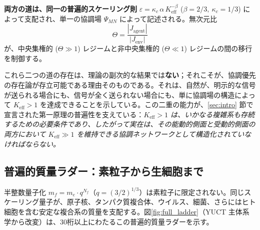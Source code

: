 \documentclass[12pt,a4paper]{article}
\begin{document}
	\medskip
	\noindent
	\textbf{両方の道は、同一の普遍的スケーリング則} \(\varepsilon = \kappa_c\,\alpha\,K_{\mathrm{eff}}^{-\beta}\) (\(\beta = 2/3,\ \kappa_c = 1/3\)) によって支配され、単一の協調場 \(\Psi_{MN}\) によって記述される。無次元比
	\[
	\Theta = \frac{|J_{\mathrm{agent}}|}{|J_{\mathrm{env}}|}
	\]
	が、中央集権的 (\(\Theta \gg 1\)) レジームと非中央集権的 (\(\Theta \ll 1\)) レジームの間の移行を制御する。
	
	これら二つの道の存在は、理論の副次的な結果では\textbf{ない}；それこそが、協調優先の存在論が存立可能である理由そのものである。それは、自然が、明示的な信号が送られる場合にも、信号が全く送られない場合にも、単に協調場の構造によって \(K_{\mathrm{eff}} > 1\) を達成できることを示している。この二重の能力が、\ref{sec:intro} 節で宣言された第一原理の普遍性を支えている：\emph{\(K_{\mathrm{eff}} > 1\) は、いかなる複雑系も存続するための必要条件であり、したがって実在は、その能動的側面と受動的側面の両方において \(K_{\mathrm{eff}} \gg 1\) を維持できる協調ネットワークとして構造化されていなければならない。}
	
	\subsection{普遍的質量ラダー：素粒子から生細胞まで}
	\label{subsec:universal-ladder}
	
	半整数量子化 \(m_f = m_e \cdot q^{N_f}\)（\(q = (3/2)^{1/3}\)）は素粒子に限定されない。同じスケーリング量子が、原子核、タンパク質複合体、ウイルス、細菌、さらにはヒト細胞を含む安定な複合系の質量を支配する。図\ref{fig:full_ladder}（YUCT 主体系学から改変）は、30桁以上にわたるこの普遍的質量ラダーを示す。
	
\end{document}
